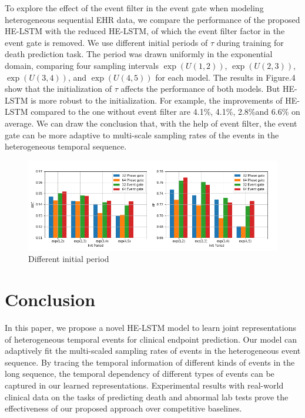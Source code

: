 \documentclass[letterpaper]{article} %
\begin{document}
To explore the effect of the event filter in the event gate when modeling heterogeneous sequential EHR data, we compare the performance of the proposed HE-LSTM with the reduced HE-LSTM, of which the event filter factor in the event gate is removed.
We use different initial periods of $\tau$ during training for death prediction task.
The period  was drawn uniformly in the exponential
domain, comparing four sampling intervals $\exp(U(1, 2))$, $\exp(U(2, 3))$, $\exp(U(3, 4))$, and
$\exp(U(4, 5))$ for each model.
The results in Figure.4 show that the initialization of $\tau$ affects the performance of both models. But HE-LSTM is more robust to the initialization. For example, the improvements of HE-LSTM compared to the one without event filter are 4.1\%, 4.1\%, 2.8\%and 6.6\% on average.
We can draw the conclusion that, with the help of event filter, the event gate can be more adaptive to multi-scale sampling rates of the events in the heterogeneous temporal sequence.

\begin{figure}[!t]
\centering
\includegraphics[width=1.09\linewidth]{init_period.png}

\caption{Different initial period}

\label{fig:period}
\end{figure}







\section{Conclusion}
In this paper, we propose a novel HE-LSTM model
to learn joint representations of heterogeneous temporal events for clinical endpoint prediction.
Our model can adaptively fit the multi-scaled sampling rates of events in the heterogeneous event sequence. By tracing the temporal information of different kinds of events in the long sequence, the temporal dependency of different types of events can be captured in our learned representations.
Experimental results with real-world clinical data on the tasks of predicting death and abnormal lab tests prove the effectiveness of our proposed approach over competitive baselines.
\end{document}
